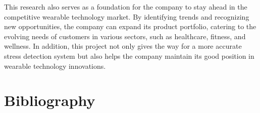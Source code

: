 \documentclass{article}
\begin{document}
This research also serves as a foundation for the company to stay ahead in the competitive wearable technology market. By identifying trends and recognizing new opportunities, the company can expand its product portfolio, catering to the evolving needs of customers in various sectors, such as healthcare, fitness, and wellness. In addition, this project not only gives the way for a more accurate stress detection system but also helps the company maintain its good position in wearable technology innovations.


\clearpage


\section{Bibliography}


\end{document}
